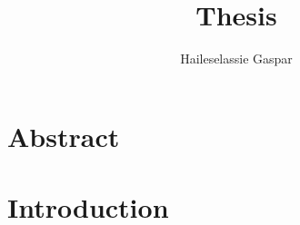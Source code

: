 \documentclass[12pt]{article}
\title{Thesis}
\author{Haileselassie Gaspar}
\begin{document}
\maketitle
\section{Abstract}
\section{Introduction}
\end{document}
